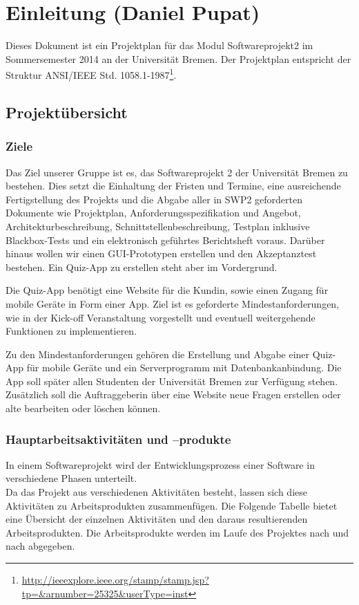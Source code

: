 \documentclass[fontsize=12pt,paper=a4,twoside]{scrartcl}
\begin{document}
\section{Einleitung (Daniel Pupat)}

Dieses Dokument ist ein Projektplan für das Modul Softwareprojekt2 im Sommersemester 2014 an der Universität Bremen. Der Projektplan entspricht der Struktur ANSI/IEEE Std. 1058.1-1987\footnote{\url{http://ieeexplore.ieee.org/stamp/stamp.jsp?tp=&arnumber=25325&userType=inst}}.

\subsection{Projektübersicht}


\subsubsection{Ziele}

Das Ziel unserer Gruppe ist es, das Softwareprojekt 2 der Universität Bremen zu bestehen. Dies setzt die Einhaltung der Fristen und Termine, eine ausreichende Fertigstellung des Projekts und die Abgabe aller in SWP2 geforderten Dokumente wie Projektplan, Anforderungsspezifikation und Angebot, Architekturbeschreibung, Schnittstellenbeschreibung, Testplan inklusive Blackbox-Tests und ein elektronisch geführtes Berichtsheft voraus. Darüber hinaus wollen wir einen GUI-Prototypen erstellen und den Akzeptanztest bestehen. Ein Quiz-App zu erstellen steht aber im Vordergrund.

Die Quiz-App benötigt eine Website für die Kundin, sowie einen Zugang für mobile Geräte in Form einer App.
 Ziel ist es geforderte Mindestanforderungen, wie in der Kick-off Veranstaltung vorgestellt und eventuell weitergehende Funktionen zu implementieren.

Zu den Mindestanforderungen gehören die Erstellung und Abgabe einer Quiz-App für mobile Geräte und ein Serverprogramm mit Datenbankanbindung. Die App soll später allen Studenten der Universität Bremen zur Verfügung stehen. Zusätzlich soll die Auftraggeberin über eine Website neue Fragen erstellen oder alte bearbeiten oder löschen können.

\subsubsection{Hauptarbeitsaktivitäten und --produkte}

In einem Softwareprojekt wird der Entwicklungsprozess einer Software in verschiedene Phasen unterteilt.\\
Da das Projekt aus verschiedenen Aktivitäten besteht, lassen sich diese Aktivitäten zu Arbeitsprodukten zusammenfügen. Die Folgende Tabelle bietet eine Übersicht der einzelnen Aktivitäten und den daraus resultierenden Arbeitsprodukten. Die Arbeitsprodukte werden im Laufe des Projektes nach und nach abgegeben.\\
\end{document}
